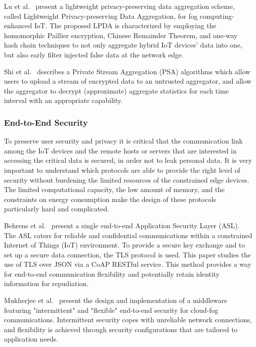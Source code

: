 Lu et al.~\cite{7869305} present a lightweight privacy-preserving data aggregation scheme, called Lightweight Privacy-preserving Data Aggregation, for fog computing-enhanced IoT. The proposed LPDA is characterized by employing the homomorphic Paillier encryption, Chinese Remainder Theorem, and one-way hash chain techniques to not only aggregate hybrid IoT devices' data into one, but also early filter injected false data at the network edge. 

Shi et al.~\cite{shi} describes a Private Stream Aggregation (PSA) algorithms which allow users to upload a stream of encrypted data to an untrusted aggregator, and allow the aggregator to decrypt (approximate) aggregate statistics for each time interval with an appropriate capability.

\subsubsection{End-to-End Security}

To preserve user security and privacy it is critical that the communication link among the IoT devices and the remote hosts or servers that are interested in accessing the critical data is secured, in order not to leak personal data. It is very important to understand which protocols are able to provide the right level of security without burdening the limited resources of the constrained edge devices. The limited computational capacity, the low amount of memory, and the constraints on energy consumption make the design of these protocols particularly hard and complicated. 

Behrens et al.~\cite{7899405} present a single end-to-end Application Security Layer (ASL). The ASL caters for reliable and confidential communications within a constrained Internet of Things (IoT) environment. To provide a secure key exchange and to set up a secure data connection, the TLS protocol is used. This paper studies the use of TLS over JSON via a CoAP RESTful service. This method provides a way for end-to-end communication flexibility and potentially retain identity information for repudiation. 

Mukherjee et al.~\cite{7987191} present the design and implementation of a middleware featuring "intermittent" and "flexible" end-to-end security for cloud-fog communications. Intermittent security copes with unreliable network connections, and flexibility is achieved through security configurations that are tailored to application needs.

